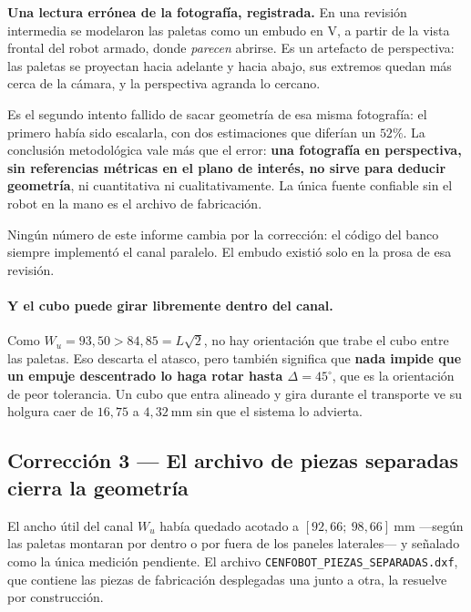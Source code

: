 \documentclass[11pt,a4paper]{article}
\newcommand{\grados}{^{\circ}}
\begin{document}
\begin{tcolorbox}[colback=black!5,colframe=black!65,boxrule=0.7pt,arc=1pt]
\textbf{Una lectura errónea de la fotografía, registrada.} En una revisión intermedia se
modelaron las paletas como un embudo en V, a partir de la vista frontal del robot armado,
donde \emph{parecen} abrirse. Es un artefacto de perspectiva: las paletas se proyectan
hacia adelante y hacia abajo, sus extremos quedan más cerca de la cámara, y la
perspectiva agranda lo cercano.

Es el segundo intento fallido de sacar geometría de esa misma fotografía: el primero
había sido escalarla, con dos estimaciones que diferían un $52\%$. La conclusión
metodológica vale más que el error: \textbf{una fotografía en perspectiva, sin
referencias métricas en el plano de interés, no sirve para deducir geometría}, ni
cuantitativa ni cualitativamente. La única fuente confiable sin el robot en la mano es
el archivo de fabricación.

\medskip
Ningún número de este informe cambia por la corrección: el código del banco siempre
implementó el canal paralelo. El embudo existió solo en la prosa de esa revisión.
\end{tcolorbox}

\paragraph{Y el cubo puede girar libremente dentro del canal.} Como
$W_u = 93{,}50 > 84{,}85 = L\sqrt2$, no hay orientación que trabe el cubo entre las
paletas. Eso descarta el atasco, pero también significa que \textbf{nada impide que un
empuje descentrado lo haga rotar hasta $\Delta = 45\grados$}, que es la orientación de
peor tolerancia. Un cubo que entra alineado y gira durante el transporte ve su holgura
caer de $16{,}75$ a $4{,}32\ \mathrm{mm}$ sin que el sistema lo advierta.

\subsection{Corrección 3 --- El archivo de piezas separadas cierra la geometría}

El ancho útil del canal $W_u$ había quedado acotado a $[92{,}66;\ 98{,}66]\ \mathrm{mm}$
---según las paletas montaran por dentro o por fuera de los paneles laterales--- y
señalado como la única medición pendiente. El archivo
\texttt{CENFOBOT\_PIEZAS\_SEPARADAS.dxf}, que contiene las piezas de fabricación
desplegadas una junto a otra, la resuelve por construcción.
\end{document}
